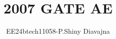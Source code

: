 \documentclass[journal]{IEEEtran}
\begin{document}

\vspace{3cm}

\title{2007 GATE AE}
\author{EE24btech11058-P.Shiny Diavajna}
{\let\newpage\relax\maketitle}

\renewcommand{\thefigure}{\theenumi}
\renewcommand{\thetable}{\theenumi}
\setlength{\intextsep}{10pt} %


\renewcommand{\thetable}{\theenumi}
\end{document}
